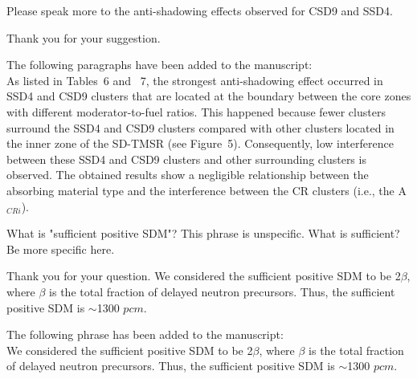 \documentclass[answers,11pt]{exam}
\begin{document}
\begin{questions}
\begin{solution}
        \end{solution}

\question Please speak more to the anti-shadowing effects observed for CSD9 and SSD4.
\begin{solution}
	Thank you for your suggestion. 
	
	The following paragraphs have been added to the manuscript:\\
	
	As listed in Tables~6 and ~7, the strongest anti-shadowing effect occurred in 
	SSD4 and CSD9 clusters that are located at the boundary between the core zones 
	with different moderator-to-fuel ratios. This happened because fewer clusters surround the SSD4 and CSD9 clusters compared with other clusters located in the inner zone of the SD-TMSR (see Figure~5). Consequently, low interference between these SSD4 and CSD9 clusters and other surrounding clusters is observed. The obtained results show a negligible relationship between the absorbing material type and the interference between the CR clusters (i.e., the A$_{CRi}$).
	

\end{solution}
\question What is "sufficient positive SDM"? This phrase is unspecific. What is sufficient? Be more specific here.
\begin{solution}
	Thank you for your question. We considered the sufficient positive SDM to be 2$\beta$, where $\beta$ is the total fraction of delayed neutron precursors. Thus, the sufficient positive SDM is $\sim$1300 $pcm$.
	
	The following phrase has been added to the manuscript:\\
	
	We considered the sufficient positive SDM to be 2$\beta$, where $\beta$ is the total fraction of delayed neutron precursors. Thus, the sufficient positive SDM is $\sim$1300 $pcm$.
	
	

\end{solution}

        
        
\end{questions}


\end{document}
